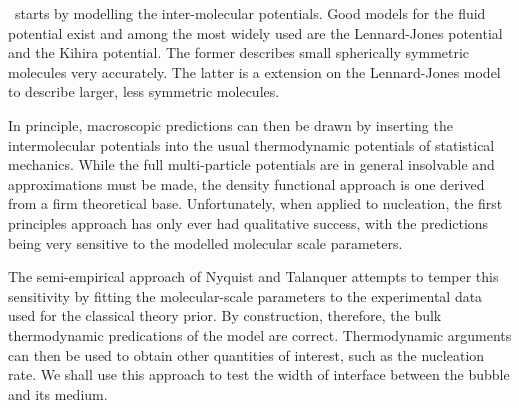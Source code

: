 
 \Dft\ starts by modelling the inter-molecular potentials.
 Good models for the fluid potential exist and 
 among the most widely used are the Lennard-Jones potential
 and the Kihira potential.
 The former describes small spherically symmetric molecules very accurately.
 The latter is a extension on the Lennard-Jones model to describe larger, less symmetric molecules.


In principle, macroscopic predictions can then be drawn by inserting the intermolecular potentials into the usual thermodynamic potentials of statistical mechanics.  
While the full multi-particle potentials are in general insolvable and approximations must be made,
the density functional approach is one derived from a firm theoretical base\cite{Evans1992}.
Unfortunately, when applied to nucleation, the first principles approach  has only ever had qualitative success\cite{Nyquist1995,Talanquer2001},
with the predictions being very sensitive to the modelled molecular scale parameters.

The semi-empirical approach of Nyquist\cite{Nyquist1995} and Talanquer\cite{Talanquer2001}
attempts to temper this sensitivity by fitting the molecular-scale parameters to the experimental data used for the classical theory prior.
By construction, therefore, the bulk thermodynamic predications of the model are correct.
Thermodynamic arguments can then be used to obtain other quantities of interest, such as the nucleation rate. 
We shall use this approach to test the width of interface between the bubble and its medium.




